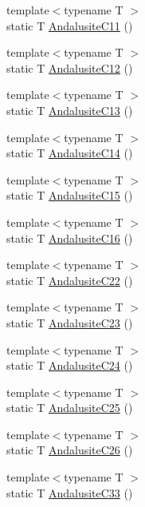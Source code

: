 \begin{DoxyCompactItemize}
{\footnotesize template$<$typename T $>$ }\\static T \mbox{\hyperlink{namespacempc_1_1data_a660d46190a6e65227d4d78051c1f5c40}{Andalusite\+C11}} ()
\item 
{\footnotesize template$<$typename T $>$ }\\static T \mbox{\hyperlink{namespacempc_1_1data_a22e3b6a9e66a84309e51fcda1f468557}{Andalusite\+C12}} ()
\item 
{\footnotesize template$<$typename T $>$ }\\static T \mbox{\hyperlink{namespacempc_1_1data_a160d4c7a42d3b200e7d39fdc62a1534e}{Andalusite\+C13}} ()
\item 
{\footnotesize template$<$typename T $>$ }\\static T \mbox{\hyperlink{namespacempc_1_1data_a19cba9d985946439c17d416f29df5965}{Andalusite\+C14}} ()
\item 
{\footnotesize template$<$typename T $>$ }\\static T \mbox{\hyperlink{namespacempc_1_1data_ad1b0bd6dc40b2cc4d1dc4e1541da7506}{Andalusite\+C15}} ()
\item 
{\footnotesize template$<$typename T $>$ }\\static T \mbox{\hyperlink{namespacempc_1_1data_ab1460702194a57dabba786817e99d480}{Andalusite\+C16}} ()
\item 
{\footnotesize template$<$typename T $>$ }\\static T \mbox{\hyperlink{namespacempc_1_1data_a63b756c052707a42d89495af0eb87a4f}{Andalusite\+C22}} ()
\item 
{\footnotesize template$<$typename T $>$ }\\static T \mbox{\hyperlink{namespacempc_1_1data_ac256fdd5e9fcee514f7aa3c43e8af59c}{Andalusite\+C23}} ()
\item 
{\footnotesize template$<$typename T $>$ }\\static T \mbox{\hyperlink{namespacempc_1_1data_a3050b53ba8d390821883ac8418dbd1d7}{Andalusite\+C24}} ()
\item 
{\footnotesize template$<$typename T $>$ }\\static T \mbox{\hyperlink{namespacempc_1_1data_a6a621576fb3619a7780264daddb59117}{Andalusite\+C25}} ()
\item 
{\footnotesize template$<$typename T $>$ }\\static T \mbox{\hyperlink{namespacempc_1_1data_a4dae1fc5875eb1fc694e2b38e49af4dc}{Andalusite\+C26}} ()
\item 
{\footnotesize template$<$typename T $>$ }\\static T \mbox{\hyperlink{namespacempc_1_1data_a6eab4de76f7a41f3d7de1ec10dbeabda}{Andalusite\+C33}} ()

\end{DoxyCompactItemize}
